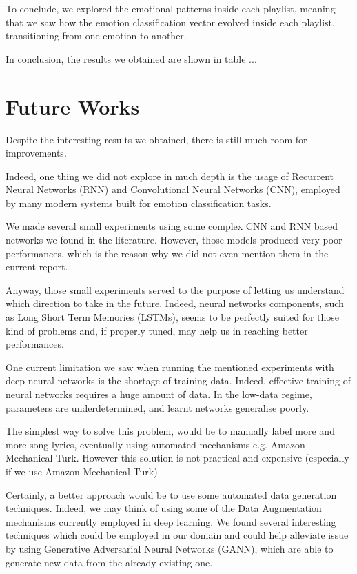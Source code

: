 To conclude, we explored the emotional patterns inside each playlist, meaning that we saw how the emotion
classification vector evolved inside each playlist, transitioning from one emotion to another.

In conclusion, the results we obtained are shown in table ...

\section{Future Works}

Despite the interesting results we obtained, there is still much room
for improvements.

Indeed, one thing we did not explore in much depth is the usage of Recurrent 
Neural Networks (RNN) and Convolutional Neural Networks (CNN), employed by
many modern systems built for emotion classification tasks.

We made several small experiments using some complex CNN and RNN based networks
we found in the literature\cite{text-emotion-classification}. However, those models produced very poor performances,
which is the reason why we did not even mention them in the current report.

Anyway, those small experiments served to the purpose of letting us understand 
which direction to take in the future. Indeed, neural networks components, such as
Long Short Term Memories (LSTMs), seems to be perfectly suited for those kind of problems
and, if properly tuned, may help us in reaching better performances.

One current limitation we saw when running the mentioned experiments with deep neural
networks is the shortage of training data. Indeed, effective training of 
neural networks requires a huge amount of data. In the low-data regime, parameters 
are underdetermined, and learnt networks generalise poorly. 

The simplest way to solve this problem, would be to manually label more and more song lyrics, eventually using
automated mechanisms e.g. Amazon Mechanical Turk\cite{amazon-turk}. However this solution is not practical
and expensive (especially if we use Amazon Mechanical Turk).

Certainly, a better approach would be to use some automated data generation techniques.
Indeed, we may think of using some of the Data Augmentation mechanisms currently employed in deep learning. 
We found several interesting techniques\cite{DBLP:journals/corr/abs-1711-00648} which could be employed in our domain
and could help alleviate issue by using Generative Adversarial Neural Networks (GANN), which
are able to generate new data from the already existing one.
